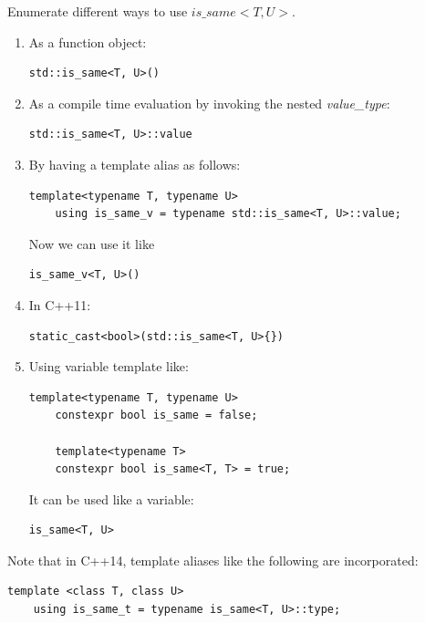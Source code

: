 \begin{Exercise}[title={is\_same musing}, difficulty=2, label=ex014]
Enumerate different ways to use $is\_same<T, U>$.
\end{Exercise}


\begin{Answer}[ref=ex014]

\begin{enumerate}
    \item As a function object:
    \begin{lstlisting}[numbers=none]
     std::is_same<T, U>()
    \end{lstlisting}
    \item As a compile time evaluation by invoking the nested \emph{value\_type}:
    \begin{lstlisting}[numbers=none]
    std::is_same<T, U>::value
    \end{lstlisting}
    \item By having a template alias as follows:
    \begin{lstlisting}[numbers=none]
    template<typename T, typename U>
    using is_same_v = typename std::is_same<T, U>::value;
    \end{lstlisting}
    Now we can use it like
     \begin{lstlisting}[numbers=none]
    is_same_v<T, U>()
    \end{lstlisting}
    \item In C++11:
    \begin{lstlisting}[numbers=none]
    static_cast<bool>(std::is_same<T, U>{})
    \end{lstlisting}
    \item Using variable template like:
    \begin{lstlisting}[numbers=none]
    template<typename T, typename U>
    constexpr bool is_same = false;

    template<typename T>
    constexpr bool is_same<T, T> = true;
    \end{lstlisting}
    It can be used like a variable:
     \begin{lstlisting}[numbers=none]
     is_same<T, U>
     \end{lstlisting}
\end{enumerate}

Note that in C++14, template aliases like the following are incorporated:
\begin{lstlisting}
template <class T, class U>
    using is_same_t = typename is_same<T, U>::type;
\end{lstlisting}
\end{Answer}






